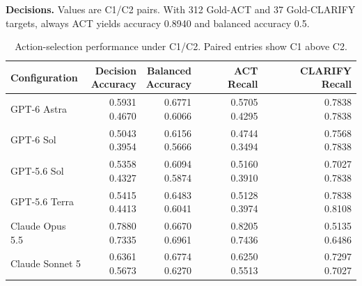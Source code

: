 \documentclass{article} %
\begin{document}
\textbf{Decisions.} Values are C1/C2 pairs. With 312 Gold-ACT and 37 Gold-CLARIFY targets, always ACT yields accuracy 0.8940 and balanced accuracy 0.5.

\begin{table}[htbp]
\caption{Action-selection performance under C1/C2. Paired entries show C1 above C2.}
\label{tab:action-selection}
\centering\normalsize
\setlength{\tabcolsep}{3pt}
\renewcommand{\arraystretch}{1.08}
\begin{tabular}{@{}lrrrr@{}}
\toprule
Configuration & \shortstack[c]{Decision\\Accuracy} & \shortstack[c]{Balanced\\Accuracy} & ACT Recall & CLARIFY Recall \\
\midrule
GPT-6 Astra & \shortstack[r]{0.5931\\0.4670} & \shortstack[r]{0.6771\\0.6066} & \shortstack[r]{0.5705\\0.4295} & \shortstack[r]{0.7838\\0.7838} \\
GPT-6 Sol & \shortstack[r]{0.5043\\0.3954} & \shortstack[r]{0.6156\\0.5666} & \shortstack[r]{0.4744\\0.3494} & \shortstack[r]{0.7568\\0.7838} \\
GPT-5.6 Sol & \shortstack[r]{0.5358\\0.4327} & \shortstack[r]{0.6094\\0.5874} & \shortstack[r]{0.5160\\0.3910} & \shortstack[r]{0.7027\\0.7838} \\
GPT-5.6 Terra & \shortstack[r]{0.5415\\0.4413} & \shortstack[r]{0.6483\\0.6041} & \shortstack[r]{0.5128\\0.3974} & \shortstack[r]{0.7838\\0.8108} \\
Claude Opus 5.5 & \shortstack[r]{0.7880\\0.7335} & \shortstack[r]{0.6670\\0.6961} & \shortstack[r]{0.8205\\0.7436} & \shortstack[r]{0.5135\\0.6486} \\
Claude Sonnet 5 & \shortstack[r]{0.6361\\0.5673} & \shortstack[r]{0.6774\\0.6270} & \shortstack[r]{0.6250\\0.5513} & \shortstack[r]{0.7297\\0.7027} \\
\bottomrule
\end{tabular}
\end{table}
\end{document}
